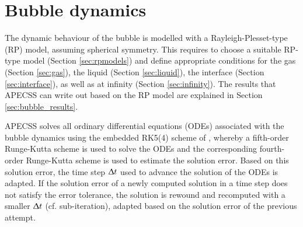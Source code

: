 \chapter{Bubble dynamics}
\label{chap:bubble}
The dynamic behaviour of the bubble is modelled with a Rayleigh-Plesset-type (RP) model, assuming spherical symmetry. This requires to choose a suitable RP-type model (Section \ref{sec:rpmodels}) and define appropriate conditions for the gas  (Section \ref{sec:gas}), the liquid (Section \ref{sec:liquid}), the interface (Section \ref{sec:interface}), as well as at infinity (Section \ref{sec:infinity}). The results that APECSS can write out based on the RP model are explained in Section \ref{sec:bubble_results}.

APECSS solves all ordinary differential equations (ODEs) associated with the bubble dynamics using the embedded RK5(4) scheme of \citet{Dormand1980}, whereby a fifth-order Runge-Kutta scheme is used to solve the ODEs and the corresponding fourth-order Runge-Kutta scheme is used to estimate the solution error. Based on this solution error, the time step $\Updelta t$ used to advance the solution of the ODEs is adapted. If the solution error of a newly computed solution in a time step does not satisfy the error tolerance, the solution is rewound and recomputed with a smaller $\Updelta t$ (cf. sub-iteration), adapted based on the solution error of the previous attempt. 

\vspace{0.8em}


